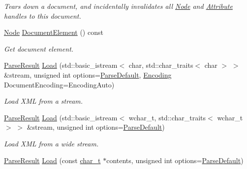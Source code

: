 \begin{DoxyCompactItemize}
\begin{DoxyCompactList}\small\item\em Tears down a document, and incidentally invalidates all \hyperlink{classMezzanine_1_1xml_1_1Node}{Node} and \hyperlink{classMezzanine_1_1xml_1_1Attribute}{Attribute} handles to this document. \item\end{DoxyCompactList}\item 
\hyperlink{classMezzanine_1_1xml_1_1Node}{Node} \hyperlink{classMezzanine_1_1xml_1_1Document_a9a716897cbc2f97cf45a27614bcc1ae2}{DocumentElement} () const 
\begin{DoxyCompactList}\small\item\em Get document element. \item\end{DoxyCompactList}\item 
\hyperlink{structMezzanine_1_1xml_1_1ParseResult}{ParseResult} \hyperlink{classMezzanine_1_1xml_1_1Document_a6f10e6e475965a1dba3d5903fefb34dd}{Load} (std::basic\_\-istream$<$ char, std::char\_\-traits$<$ char $>$ $>$ \&stream, unsigned int options=\hyperlink{namespaceMezzanine_1_1xml_a0eb617274d4b3cb604f3120bcdaf9850}{ParseDefault}, \hyperlink{namespaceMezzanine_1_1xml_ab1e7e96991b9c08ac13e797a15253804}{Encoding} DocumentEncoding=EncodingAuto)
\begin{DoxyCompactList}\small\item\em Load XML from a stream. \item\end{DoxyCompactList}\item 
\hyperlink{structMezzanine_1_1xml_1_1ParseResult}{ParseResult} \hyperlink{classMezzanine_1_1xml_1_1Document_a7b7f1d7502741b28bc4c370229ddacc9}{Load} (std::basic\_\-istream$<$ wchar\_\-t, std::char\_\-traits$<$ wchar\_\-t $>$ $>$ \&stream, unsigned int options=\hyperlink{namespaceMezzanine_1_1xml_a0eb617274d4b3cb604f3120bcdaf9850}{ParseDefault})
\begin{DoxyCompactList}\small\item\em Load XML from a wide stream. \item\end{DoxyCompactList}\item 
\hyperlink{structMezzanine_1_1xml_1_1ParseResult}{ParseResult} \hyperlink{classMezzanine_1_1xml_1_1Document_abff215271434b7e705144ddda0dbe85b}{Load} (const \hyperlink{namespaceMezzanine_1_1xml_a29b8a47c179e9895c4e9e66c45d1dbbc}{char\_\-t} $\ast$contents, unsigned int options=\hyperlink{namespaceMezzanine_1_1xml_a0eb617274d4b3cb604f3120bcdaf9850}{ParseDefault})

\end{DoxyCompactItemize}
